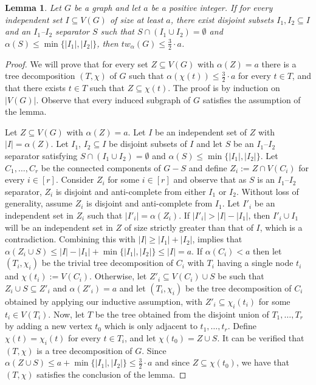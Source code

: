 \documentclass[11pt]{amsart}
\newtheorem{lemma}[theorem]{Lemma}
\newcommand{\atw}{tw_{\alpha}\xspace}
\begin{document}
\begin{lemma}\label{lem:tree_alpha_separator}
    Let $G$ be a graph and let $a$ be a positive integer. If for every independent set $I \subseteq V(G)$ of size at least $a$, there exist disjoint subsets $I_1, I_2 \subseteq I$ and an $I_1$--$I_2$ separator $S$ such that $S \cap (I_1 \cup I_2) = \emptyset$ and $\alpha(S) \leq \min\{|I_1|, |I_2|\}$, then $\atw(G) \leq \frac{3}{2} \cdot a$.
\end{lemma}
\begin{proof}
    We will prove that for every set $Z \subseteq V(G)$ with $\alpha(Z) = a$ there is a tree decomposition $(T,\chi)$ of $G$ such that $\alpha(\chi(t)) \leq \frac{3}{2} \cdot a$ for every $t \in T$, and that there exists $t \in T$ such that $Z \subseteq \chi(t)$. The proof is by induction on $|V(G)|$. Observe that every induced subgraph of $G$ satisfies the assumption of the lemma.
  
    Let $Z \subseteq V(G)$ with $\alpha(Z) = a$. Let $I$ be an independent set of $Z$ with $|I|=\alpha(Z)$. Let $I_1$, $I_2\subseteq I$ be disjoint subsets of $I$ and let $S$ be an $I_1$--$I_2$ separator satisfying $S\cap (I_1\cup I_2) = \emptyset$ and $\alpha(S)\leq \min\{|I_1|, |I_2|\}$. Let $C_1,\dots, C_r$ be the connected components of $G-S$ and define $Z_i := Z\cap V(C_i)$ for every $i\in [r]$. Consider $Z_i$ for some $i\in [r]$ and observe that as $S$ is an $I_1$--$I_2$ separator, $Z_i$ is disjoint and anti-complete from either $I_1$ or $I_2$. Without loss of generality, assume $Z_i$ is disjoint and anti-complete from $I_1$. 
    Let $I'_i$ be an independent set in $Z_i$ such that $|I'_i| = \alpha(Z_i)$. If $|I'_i| > |I|-|I_1|$, then $I'_i\cup I_1$ will be an independent set in $Z$ of size strictly greater than that of $I$, which is a contradiction. Combining this with $|I|\geq |I_1|+|I_2|$, implies that $\alpha(Z_i\cup S) \leq |I|-|I_1| + \min\{|I_1|, |I_2|\} \leq |I| = a$. If $\alpha(C_i) < a$ then let $(T_i,\chi_i)$ be the trivial tree decomposition of $C_i$ with $T_i$ having a single node $t_i$ and $\chi(t_i) := V(C_i)$. 
    Otherwise, let $Z'_i\subseteq V(C_i)\cup S$ be such that $Z_i\cup S\subseteq Z'_i$ and $\alpha(Z'_i) = a$ and let $(T_i,\chi_i)$ be the tree decomposition of $C_i$ obtained by applying our inductive assumption, with $Z'_i\subseteq\chi_i(t_i)$ for some $t_i\in V(T_i)$. Now, let $T$ be the tree obtained from the disjoint union of $T_1, \dots, T_r$ by adding a new vertex $t_0$ which is only adjacent to $t_1, \dots, t_r$. Define $\chi(t)=\chi_i(t)$ for every $t \in T_i$, and let $\chi(t_0) = Z \cup S$. It can be verified that $(T,\chi)$ is a tree decomposition of $G$. Since $\alpha(Z\cup S) \leq a + \min\{|I_1|,|I_2|\} \leq \frac{3}{2} \cdot a$ and since $Z\subseteq \chi(t_0)$, we have that $(T,\chi)$ satisfies the conclusion of the lemma.
\end{proof}
\end{document}
